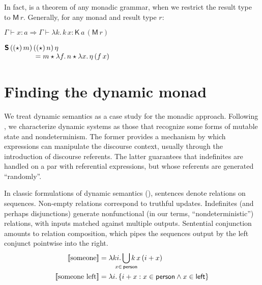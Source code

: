   In fact,  is a theorem of any monadic grammar, when we restrict the result type to $\textsf{M}\,r$. Generally, for any monad  and result type $r$:%
	\begin{fact}%
    $\Gamma \vdash x : a \Rightarrow \Gamma \vdash \lambda k.\,k\,x : \textsf{K}\,a\,(\textsf{M}\,r)$%
	\end{fact}
	\begin{fact}%
		$\begin{array}[t]{@{}r@{}l@{}}
			\bsf{S}\,((\star)\,m)\,&((\star)\,n)\,\eta 
			\\
			&{}= m \star \lambda f.\,n \star \lambda x.\,\eta\,(f\,x)%
			\\
		\end{array}$%
	\end{fact}

\section{Finding the dynamic monad}
  We treat dynamic semantics as a case study for the monadic approach. Following \citet{Shan:2001}, we characterize dynamic systems as those that recognize some forms of mutable state and nondeterminism. The former provides a mechanism by which expressions can manipulate the discourse context, usually through the introduction of discourse referents. The latter guarantees that indefinites are handled on a par with referential expressions, but whose referents are generated ``randomly''.%
	
  In classic formulations of dynamic semantics (\citealt{Heim:1982, Kamp:1981, GroenendijkStokhof:1991, Dekker:1994}), sentences denote relations on sequences. Non-empty relations correspond to truthful updates. Indefinites (and perhaps disjunctions) generate nonfunctional (in our terms, ``nondeterministic'') relations, with inputs matched against multiple outputs. Sentential conjunction amounts to relation composition, which pipes the sequences output by the left conjunct pointwise into the right.%
  \begin{align}%
    \label{eq:classic-indef}%
		\sv{\text{someone}} &= \lambda ki.\displaystyle\bigcup_{\mathclap{x\in\,\textsf{person}}}k\,x\,(i + x)%
		\\
		\sv{\text{someone left}} &= \lambda i.\,\{i + x : x \in \textsf{person} \wedge x \in \textsf{left}\}%
    \notag
  \end{align}%

